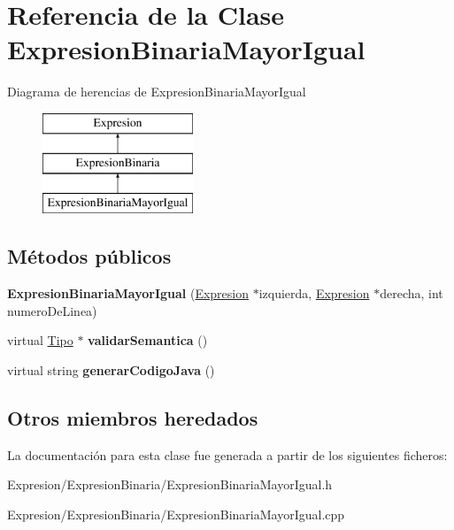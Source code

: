 \hypertarget{class_expresion_binaria_mayor_igual}{\section{Referencia de la Clase Expresion\-Binaria\-Mayor\-Igual}
\label{class_expresion_binaria_mayor_igual}
}
Diagrama de herencias de Expresion\-Binaria\-Mayor\-Igual\begin{figure}[H]
\begin{center}
\leavevmode
\includegraphics[height=3.000000cm]{class_expresion_binaria_mayor_igual}
\end{center}
\end{figure}
\subsection*{Métodos públicos}
\begin{DoxyCompactItemize}
\item 
\hypertarget{class_expresion_binaria_mayor_igual_abc403e915311ba1b100a4ac401c5daf2}{{\bfseries Expresion\-Binaria\-Mayor\-Igual} (\hyperlink{class_expresion}{Expresion} $\ast$izquierda, \hyperlink{class_expresion}{Expresion} $\ast$derecha, int numero\-De\-Linea)}\label{class_expresion_binaria_mayor_igual_abc403e915311ba1b100a4ac401c5daf2}

\item 
\hypertarget{class_expresion_binaria_mayor_igual_ae90f0ce32c6283eb1f112eb30390d755}{virtual \hyperlink{class_tipo}{Tipo} $\ast$ {\bfseries validar\-Semantica} ()}\label{class_expresion_binaria_mayor_igual_ae90f0ce32c6283eb1f112eb30390d755}

\item 
\hypertarget{class_expresion_binaria_mayor_igual_a6352bc5ca272bf89e4f166eb92d2af57}{virtual string {\bfseries generar\-Codigo\-Java} ()}\label{class_expresion_binaria_mayor_igual_a6352bc5ca272bf89e4f166eb92d2af57}

\end{DoxyCompactItemize}
\subsection*{Otros miembros heredados}


La documentación para esta clase fue generada a partir de los siguientes ficheros\-:\begin{DoxyCompactItemize}
\item 
Expresion/\-Expresion\-Binaria/Expresion\-Binaria\-Mayor\-Igual.\-h\item 
Expresion/\-Expresion\-Binaria/Expresion\-Binaria\-Mayor\-Igual.\-cpp\end{DoxyCompactItemize}
